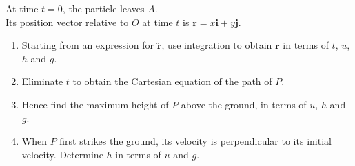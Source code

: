 \documentclass[leqno]{article}
\begin{document}
\begin{enumerate}[
  label=\textbf{\arabic*.},
  leftmargin=*,
  topsep=0pt,
  partopsep=0pt,
  parsep=0pt
]
At time $t=0$, the particle leaves $A$. \\
Its position vector relative to $O$ at time $t$ is $\mathbf{r}=x\mathbf{i}+y\mathbf{j}$. \\

\begin{enumerate}[label=\textbf{(\alph*)}]
\item Starting from an expression for $\ddot{\mathbf{r}}$, use integration to obtain $\mathbf{r}$ in terms of $t$, $u$, $h$ and $g$.  \\
\item Eliminate $t$ to obtain the Cartesian equation of the path of $P$.  \\
\item Hence find the maximum height of $P$ above the ground, in terms of $u$, $h$ and $g$.  \\
\item When $P$ first strikes the ground, its velocity is perpendicular to its initial velocity. Determine $h$ in terms of $u$ and $g$.  \\
\end{enumerate}

\vspace*{10pt}

\begin{djsSolution}
\begin{djsSolutionFigure}
\end{djsSolutionFigure}
\end{djsSolution}
\end{enumerate}
\end{document}
